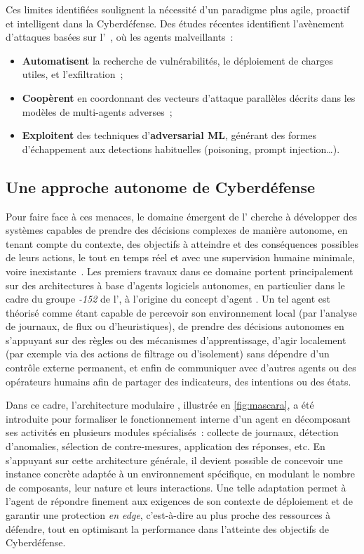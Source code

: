 Ces limites identifiées soulignent la nécessité d'un paradigme plus agile, proactif et intelligent dans la Cyberdéfense. Des études récentes identifient l'avènement d'attaques basées sur l'~\cite{Miles2018,AutoAttacker2024,Falong2025}, où les agents malveillants~:
\begin{itemize}
  \item \textbf{Automatisent} la recherche de vulnérabilités, le déploiement de charges utiles, et l'exfiltration~;
  \item \textbf{Coopèrent} en coordonnant des vecteurs d'attaque parallèles décrits dans les modèles de multi-agents adverses~;
  \item \textbf{Exploitent} des techniques d'\textbf{adversarial ML}, générant des formes d'échappement aux detections habituelles (poisoning, prompt injection…).
\end{itemize}

\subsection*{Une approche autonome de Cyberdéfense}

Pour faire face à ces menaces, le domaine émergent de l' cherche à développer des systèmes capables de prendre des décisions complexes de manière autonome, en tenant compte du contexte, des objectifs à atteindre et des conséquences possibles de leurs actions, le tout en temps réel et avec une supervision humaine minimale, voire inexistante~\cite{Vyas2023}. Les premiers travaux dans ce domaine portent principalement sur des architectures à base d'agents logiciels autonomes, en particulier dans le cadre du groupe \textit{-152} de l', à l'origine du concept d'agent .
Un tel agent est théorisé comme étant capable de percevoir son environnement local (par l'analyse de journaux, de flux ou d'heuristiques), de prendre des décisions autonomes en s'appuyant sur des règles ou des mécanismes d'apprentissage, d'agir localement (par exemple via des actions de filtrage ou d'isolement) sans dépendre d'un contrôle externe permanent, et enfin de communiquer avec d'autres agents ou des opérateurs humains afin de partager des indicateurs, des intentions ou des états.

Dans ce cadre, l'architecture modulaire , illustrée en \autoref{fig:mascara}, a été introduite pour formaliser le fonctionnement interne d'un agent  en décomposant ses activités en plusieurs modules spécialisés~: collecte de journaux, détection d'anomalies, sélection de contre-mesures, application des réponses, etc. En s'appuyant sur cette architecture générale, il devient possible de concevoir une instance concrète adaptée à un environnement spécifique, en modulant le nombre de composants, leur nature et leurs interactions. Une telle adaptation permet à l'agent  de répondre finement aux exigences de son contexte de déploiement et de garantir une protection {\em en edge}, c'est-à-dire au plus proche des ressources à défendre, tout en optimisant la performance dans l'atteinte des objectifs de Cyberdéfense.

